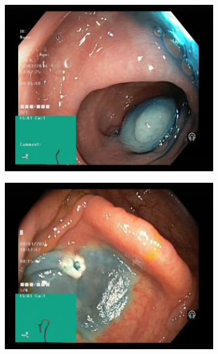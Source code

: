  
    
\newpage


    \begin{figure}[t]
        \centering
        \begin{subfigure}[b]{0.4\textwidth}
            \centering
            \includegraphics[width=\textwidth]{experiments/images/dyed-lifted-polyps.jpg}
            \caption[Is this in use]%
            {{\small  }}    
            \label{fig:polypAEGREEN}
        \end{subfigure}
        \qquad
        \begin{subfigure}[b]{0.4\textwidth}  
            \centering 
            \includegraphics[width=\textwidth]{experiments/images/dyed-resection-margins.jpg}

\end{subfigure}
\end{figure}
